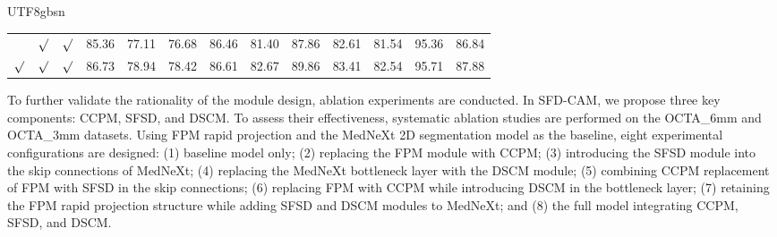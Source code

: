 \documentclass[times, review, 10pt]{elsarticle}
\begin{document}
\begin{CJK}{UTF8}{gbsn}
\begin{table}[tbp]
\begin{tabular}{lllllllllllll}
~                     & $\surd$                     & $\surd$                     & 85.36 & 77.11 & 76.68 & 86.46 & 81.40                     & 87.86 & 82.61 & 81.54 & 95.36 & 86.84\textbf{}             \\
$\surd$                     & $\surd$                     & $\surd$                     & 86.73 & 78.94 & 78.42 & 86.61 & 82.67                     & 89.86 & 83.41 & 82.54 & 95.71 & 87.88\textbf{}             \\
\bottomrule
\end{tabular}
\end{table}

To further validate the rationality of the module design, ablation experiments are conducted. In SFD-CAM, we propose three key components: CCPM, SFSD, and DSCM. To assess their effectiveness, systematic ablation studies are performed on the OCTA\_6mm and OCTA\_3mm datasets. Using FPM rapid projection and the MedNeXt 2D segmentation model as the baseline, eight experimental configurations are designed: (1) baseline model only; (2) replacing the FPM module with CCPM; (3) introducing the SFSD module into the skip connections of MedNeXt; (4) replacing the MedNeXt bottleneck layer with the DSCM module; (5) combining CCPM replacement of FPM with SFSD in the skip connections; (6) replacing FPM with CCPM while introducing DSCM in the bottleneck layer; (7) retaining the FPM rapid projection structure while adding SFSD and DSCM modules to MedNeXt; and (8) the full model integrating CCPM, SFSD, and DSCM.
\par

\end{CJK}
\end{document}

